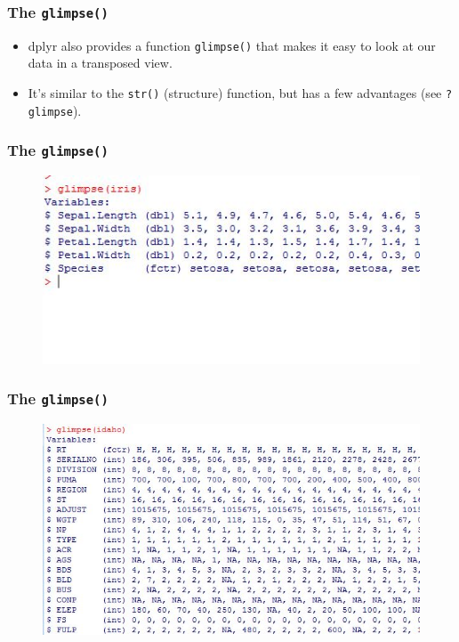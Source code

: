 \documentclass{beamer}
\begin{document}
	\begin{frame}[fragile]
		
		\frametitle{The \texttt{glimpse()}} 
			\begin{itemize}
				\item dplyr also provides a function \texttt{glimpse()} that makes it easy to look at our data in a transposed view. 
				
				\item It's similar to the \texttt{str()} (structure) function, but has a few advantages (see \texttt{?glimpse}).
				
			\end{itemize}
		\end{frame}
		\begin{frame}[fragile]
			
			\frametitle{The \texttt{glimpse()} }
				\begin{figure}
					\centering
					\includegraphics[width=0.7\linewidth]{images/irisglimpse}
				
				\end{figure}
				
			\end{frame}
			\begin{frame}[fragile]
				\frametitle{The \texttt{glimpse()} }
					
\begin{figure}
\centering
\includegraphics[width=0.7\linewidth]{images/idahoglimpse}

\end{figure}
					
				\end{frame}
\end{document}

